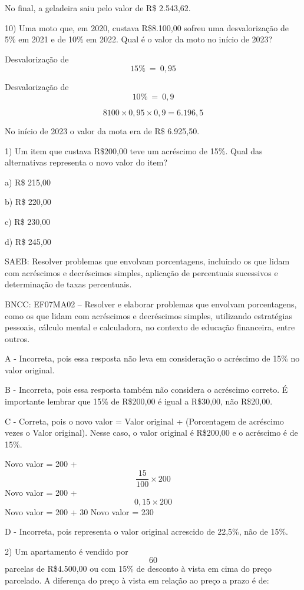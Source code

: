 No final, a geladeira saiu pelo valor de R\$ 2.543,62.

10) Uma moto que, em 2020, custava R\$8.100,00 sofreu uma desvalorização
de 5\% em 2021 e de 10\% em 2022. Qual é o valor da moto no início de
2023?

Desvalorização de \[15\%\  = \ 0,95\]

Desvalorização de \[10\%\  = \ 0,9\]

\[8100 \times 0,95 \times 0,9 = 6.196,5\]

No início de 2023 o valor da mota era de R\$ 6.925,50.


1) Um item que custava R\$200,00 teve um acréscimo de 15\%. Qual das
alternativas representa o novo valor do item?

a) R\$ 215,00

b) R\$ 220,00

c) R\$ 230,00

d) R\$ 245,00

SAEB: Resolver problemas que envolvam porcentagens, incluindo os que
lidam com acréscimos e decréscimos simples, aplicação de percentuais
sucessivos e determinação de taxas percentuais.

BNCC: EF07MA02 -- Resolver e elaborar problemas que envolvam
porcentagens, como os que lidam com acréscimos e decréscimos simples,
utilizando estratégias pessoais, cálculo mental e calculadora, no
contexto de educação financeira, entre outros.

A - Incorreta, pois essa resposta não leva em consideração o acréscimo
de 15\% no valor original.

B - Incorreta, pois essa resposta também não considera o acréscimo
correto. É importante lembrar que 15\% de R\$200,00 é igual a R\$30,00,
não R\$20,00.

C - Correta, pois o novo valor = Valor original + (Porcentagem de
acréscimo vezes o Valor original). Nesse caso, o valor original é
R\$200,00 e o acréscimo é de 15\%.

Novo valor = 200 + \[\frac {15}{100}\times 200\] Novo valor = 200 +
\[0,15 \times 200\] Novo valor = 200 + 30 Novo valor = 230

D - Incorreta, pois representa o valor original acrescido de 22,5\%, não
de 15\%.

2) Um apartamento é vendido por \[60\] parcelas de R\$4.500,00 ou com
15\% de desconto à vista em cima do preço parcelado. A diferença do
preço à vista em relação ao preço a prazo é de:

